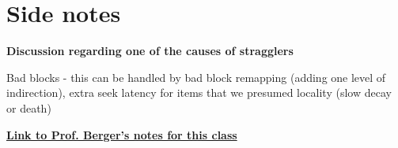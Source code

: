\documentclass[twoside]{article}
\begin{document}
\section*{Side notes}

\textbf{Discussion regarding one of the causes of stragglers}

Bad blocks - this can be handled by bad block remapping (adding one level of indirection), extra seek latency for items that we presumed locality (slow decay or death)

\vspace{0.2in}

\textbf{\href{https://github.com/emeryberger/COMPSCI590S/blob/master/lectures/2017/COMPSCI\%20590S\%20Dec\%205\%2C\%202017.pdf}{Link to Prof. Berger's notes for this class}}
\end{document}

